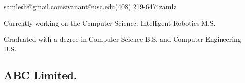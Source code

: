 \documentclass{resume}
\begin{document}
{samlesh@gmail.com}{sivanant@usc.edu}{(408) 219-6474}{zamlz}


Currently working on the Computer Science: Intelligent Robotics M.S.

Graduated with a degree in Computer Science B.S. and Computer Engineering B.S.


\subsection{ABC Limited.}

\end{document}
